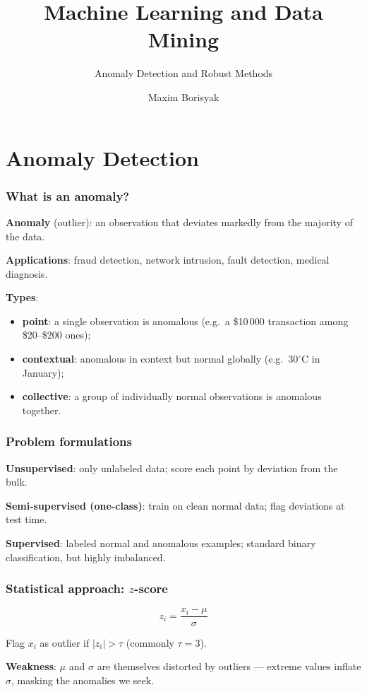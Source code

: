 \documentclass[]{beamer}
\subtitle{Anomaly Detection and Robust Methods}
\author{Maxim Borisyak}
\institute{Constructor University Bremen}
\begin{document}
\title{Machine Learning and Data Mining}

\begin{frame}[plain]
\titlepage
\end{frame}

\section{Anomaly Detection}

\begin{frame}[fragile]
\frametitle{What is an anomaly?}
\textbf{Anomaly} (outlier): an observation that deviates markedly from the majority of the data.

\textbf{Applications}: fraud detection, network intrusion, fault detection, medical diagnosis.

\textbf{Types}:
\begin{itemize}
  \item \textbf{point}: a single observation is anomalous (e.g.\ a \$10\,000 transaction among \$20--\$200 ones);
  \item \textbf{contextual}: anomalous in context but normal globally (e.g.\ $30^\circ$C in January);
  \item \textbf{collective}: a group of individually normal observations is anomalous together.
\end{itemize}

\end{frame}

\begin{frame}[fragile]
\frametitle{Problem formulations}
\textbf{Unsupervised}: only unlabeled data; score each point by deviation from the bulk.

\textbf{Semi-supervised (one-class)}: train on clean normal data; flag deviations at test time.

\textbf{Supervised}: labeled normal and anomalous examples; standard binary classification, but highly imbalanced.

\end{frame}

\begin{frame}[fragile]
\frametitle{Statistical approach: $z$-score}
\begin{equation*}
z_i = \frac{x_i - \mu}{\sigma}
\end{equation*}

Flag $x_i$ as outlier if $|z_i| > \tau$ (commonly $\tau = 3$).

\textbf{Weakness}: $\mu$ and $\sigma$ are themselves distorted by outliers --- extreme values inflate $\sigma$, masking the anomalies we seek.

\end{frame}
\end{document}
